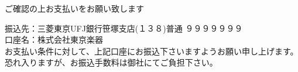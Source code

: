 ご確認の上お支払いをお願い致します \\

\parbox{\textwidth}{
振込先：三菱東京UFJ銀行笹塚支店(１３８)普通 ９９９９９９９ \\
口座名：株式会社東京楽器 \\
お支払い条件に対して、上記口座にお振込下さいますようお願い申し上げます。\\
恐れ入りますが、お振込手数料は御社にてご負担下さい。
}